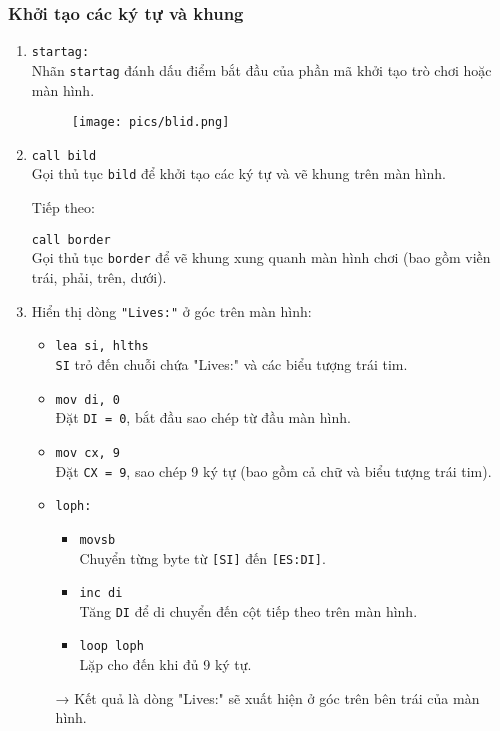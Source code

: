\documentclass[12pt]{article}
\begin{document}
\subsubsection*{Khởi tạo các ký tự và khung}
\begin{enumerate}[label=\textbf{\arabic*.}]
    \item \texttt{startag:} \\
    Nhãn \texttt{startag} đánh dấu điểm bắt đầu của phần mã khởi tạo trò chơi hoặc màn hình.

    \begin{figure}[H]
  \centering
  \texttt{[image: pics/blid.png]}
\end{figure}
    \item \texttt{call bild} \\
    Gọi thủ tục \texttt{bild} để khởi tạo các ký tự và vẽ khung trên màn hình.

    Tiếp theo:
    
    \texttt{call border} \\
    Gọi thủ tục \texttt{border} để vẽ khung xung quanh màn hình chơi (bao gồm viền trái, phải, trên, dưới).

    \item Hiển thị dòng \texttt{"Lives:"} ở góc trên màn hình:
    
    \begin{itemize}
        \item \texttt{lea si, hlths} \\
        \texttt{SI} trỏ đến chuỗi chứa "Lives:" và các biểu tượng trái tim.
        
        \item \texttt{mov di, 0} \\
        Đặt \texttt{DI = 0}, bắt đầu sao chép từ đầu màn hình.
        
        \item \texttt{mov cx, 9} \\
        Đặt \texttt{CX = 9}, sao chép 9 ký tự (bao gồm cả chữ và biểu tượng trái tim).
        
        \item \texttt{loph:}
        \begin{itemize}
            \item \texttt{movsb} \\
            Chuyển từng byte từ \texttt{[SI]} đến \texttt{[ES:DI]}.
            \item \texttt{inc di} \\
            Tăng \texttt{DI} để di chuyển đến cột tiếp theo trên màn hình.
            \item \texttt{loop loph} \\
            Lặp cho đến khi đủ 9 ký tự.
        \end{itemize}
        → Kết quả là dòng "Lives:" sẽ xuất hiện ở góc trên bên trái của màn hình.
    \end{itemize}


\end{enumerate}
\end{document}
